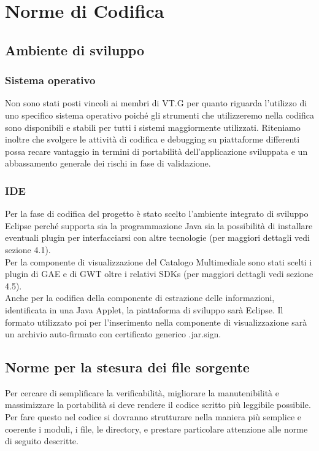 \chapter{Norme di Codifica}
\thispagestyle{fancy} 
\section{Ambiente di sviluppo}

\subsection{Sistema operativo}
Non sono stati posti vincoli ai membri di VT.G per quanto riguarda l'utilizzo di
uno specifico sistema operativo poich\'e gli strumenti che utilizzeremo nella
codifica sono disponibili e stabili per tutti i sistemi maggiormente utilizzati.
Riteniamo inoltre che svolgere le attivit\`a di codifica e debugging su
piattaforme differenti possa recare vantaggio in termini di portabilit\`a
dell'applicazione sviluppata e un abbassamento generale dei rischi in fase di
validazione.

\subsection{IDE}
Per la fase di codifica del progetto \`e stato scelto l'ambiente
integrato di sviluppo Eclipse perch\'e supporta sia la programmazione Java
sia la possibilit\`a  di installare eventuali plugin per interfacciarsi con
altre tecnologie (per maggiori dettagli vedi sezione 4.1).\\
Per la componente di visualizzazione del Catalogo
Multimediale sono stati scelti i plugin di GAE e di GWT oltre i relativi SDKs
(per maggiori dettagli vedi sezione 4.5).\\ 
Anche per la codifica della componente di estrazione delle informazioni,
identificata in una Java Applet, la piattaforma di sviluppo sar\`a Eclipse. Il
formato utilizzato poi per l'inserimento nella componente di visualizzazione
sar\`a un archivio auto-firmato con certificato generico .jar.sign.

\section{Norme per la stesura dei file sorgente}
Per cercare di semplificare la verificabilit\`a,
migliorare la manutenibilit\`a e massimizzare la portabilit\`a si deve rendere il codice scritto pi\`u leggibile possibile.\\
Per fare questo nel codice si dovranno strutturare nella maniera pi\`u semplice e coerente i moduli, i
file, le directory, e prestare particolare attenzione alle norme di seguito
descritte.

